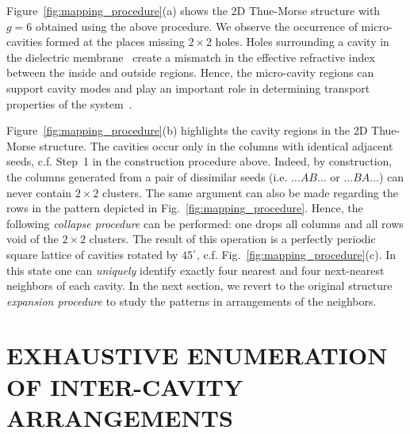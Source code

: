 Figure~\ref{fig:mapping_procedure}(a) shows the 2D Thue-Morse structure with $g=6$ obtained using the above procedure. We observe the occurrence of micro-cavities formed at the places missing $2\times2$ holes. Holes surrounding a cavity in the dielectric membrane~\cite{2011_Cao_DAS} create a mismatch in the effective refractive index between the inside and outside regions. Hence, the micro-cavity regions can support cavity modes and play an important role in determining transport properties of the system~\cite{2007_Moretti,2008_Boriskina}. 

Figure~\ref{fig:mapping_procedure}(b) highlights the cavity regions in the 2D Thue-Morse structure. The cavities occur only in the columns with identical adjacent seeds, c.f. Step~1 in the construction procedure above. Indeed, by construction, the columns generated from a pair of dissimilar seeds (i.e. $\ldots AB \ldots$ or $\ldots BA \ldots$) can never contain $2\times2$ clusters. The same argument can also be made regarding the rows in the pattern depicted in Fig.~\ref{fig:mapping_procedure}. Hence, the following {\it collapse procedure} can be performed: one drops all columns and all rows void of the $2\times2$ clusters. The result of this operation is a perfectly periodic square lattice of cavities rotated by $45^\circ$, c.f. Fig.~\ref{fig:mapping_procedure}(c). In this state one can {\it uniquely} identify exactly four nearest and four next-nearest neighbors of each cavity. In the next section, we revert to the original structure {\it expansion procedure} to study the patterns in arrangements of the neighbors.

\section{EXHAUSTIVE ENUMERATION OF INTER-CAVITY ARRANGEMENTS}

